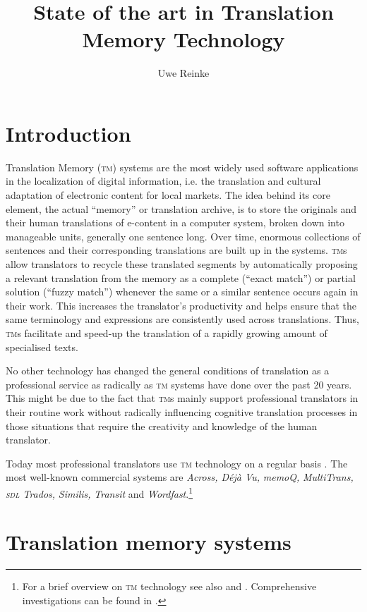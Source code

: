 \documentclass[output=paper]{LSP/langsci}
\author{Uwe Reinke\affiliation{Cologne University of Applied Sciences} }
\title{State of the art in Translation Memory Technology}
\begin{document}

\section{Introduction}\label{sec:reinke:1}

Translation Memory (\textsc{tm}) systems are the most widely used software applications in the localization of digital information, i.e. the translation and cultural adaptation of electronic content for local markets. The idea behind its core element, the actual ``memory'' or translation archive, is to store the originals and their human translations of e-content in a computer system, broken down into manageable units, generally one sentence long. Over time, enormous collections of sentences and their corresponding translations are built up in the systems. \textsc{tm}s allow translators to recycle these translated segments by automatically proposing a relevant translation from the memory as a complete (``exact match'') or partial solution (``fuzzy match'') whenever the same or a similar sentence occurs again in their work. This increases the translator's productivity and helps ensure that the same terminology and expressions are consistently used across translations. Thus, \textsc{tm}s facilitate and speed-up the translation of a rapidly growing amount of specialised texts.

No other technology has changed the general conditions of translation as a professional service as radically as \textsc{tm} systems have done over the past 20 years. This might be due to the fact that \textsc{tm}s mainly support professional translators in their routine work without radically influencing cognitive translation processes in those situations that require the creativity and knowledge of the human translator.

Today most professional translators use \textsc{tm} technology on a regular basis \citet{Massion2005,Lagoudaki2006}. The most well-known commercial systems are \textit{Across, Déjà Vu,} \textit{memoQ,} \textit{MultiTrans,} \textit{\textsc{sdl} Trados,} \textit{Similis,} \textit{Transit} and \textit{Word\-fast}.\footnote{For a brief overview on \textsc{tm} technology see also \citet{Somers2003} and \citet{Reinke2006}. Comprehensive investigations can be found in \citet{Reinke2004}.}

\section{Translation memory systems}\label{sec:reinke:2}
\end{document}
